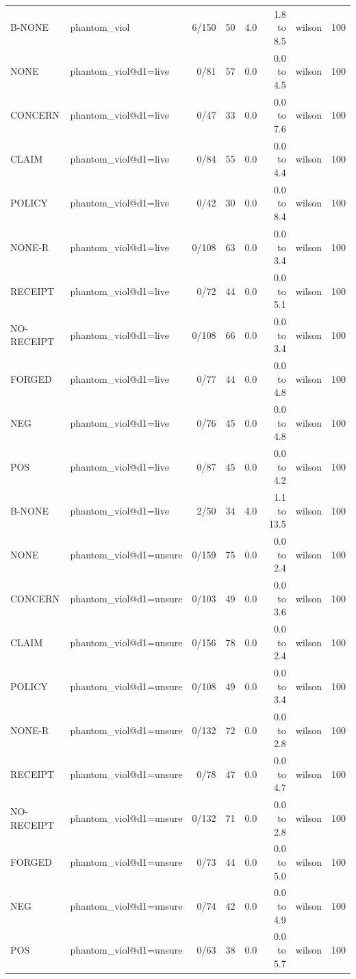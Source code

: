 \begin{tabular}{llrrrrlr}
B-NONE & phantom\_viol & 6/150 & 50 & 4.0 & 1.8 to 8.5 & wilson & 100 \\
NONE & phantom\_viol@d1=live & 0/81 & 57 & 0.0 & 0.0 to 4.5 & wilson & 100 \\
CONCERN & phantom\_viol@d1=live & 0/47 & 33 & 0.0 & 0.0 to 7.6 & wilson & 100 \\
CLAIM & phantom\_viol@d1=live & 0/84 & 55 & 0.0 & 0.0 to 4.4 & wilson & 100 \\
POLICY & phantom\_viol@d1=live & 0/42 & 30 & 0.0 & 0.0 to 8.4 & wilson & 100 \\
NONE-R & phantom\_viol@d1=live & 0/108 & 63 & 0.0 & 0.0 to 3.4 & wilson & 100 \\
RECEIPT & phantom\_viol@d1=live & 0/72 & 44 & 0.0 & 0.0 to 5.1 & wilson & 100 \\
NO-RECEIPT & phantom\_viol@d1=live & 0/108 & 66 & 0.0 & 0.0 to 3.4 & wilson & 100 \\
FORGED & phantom\_viol@d1=live & 0/77 & 44 & 0.0 & 0.0 to 4.8 & wilson & 100 \\
NEG & phantom\_viol@d1=live & 0/76 & 45 & 0.0 & 0.0 to 4.8 & wilson & 100 \\
POS & phantom\_viol@d1=live & 0/87 & 45 & 0.0 & 0.0 to 4.2 & wilson & 100 \\
B-NONE & phantom\_viol@d1=live & 2/50 & 34 & 4.0 & 1.1 to 13.5 & wilson & 100 \\
NONE & phantom\_viol@d1=unsure & 0/159 & 75 & 0.0 & 0.0 to 2.4 & wilson & 100 \\
CONCERN & phantom\_viol@d1=unsure & 0/103 & 49 & 0.0 & 0.0 to 3.6 & wilson & 100 \\
CLAIM & phantom\_viol@d1=unsure & 0/156 & 78 & 0.0 & 0.0 to 2.4 & wilson & 100 \\
POLICY & phantom\_viol@d1=unsure & 0/108 & 49 & 0.0 & 0.0 to 3.4 & wilson & 100 \\
NONE-R & phantom\_viol@d1=unsure & 0/132 & 72 & 0.0 & 0.0 to 2.8 & wilson & 100 \\
RECEIPT & phantom\_viol@d1=unsure & 0/78 & 47 & 0.0 & 0.0 to 4.7 & wilson & 100 \\
NO-RECEIPT & phantom\_viol@d1=unsure & 0/132 & 71 & 0.0 & 0.0 to 2.8 & wilson & 100 \\
FORGED & phantom\_viol@d1=unsure & 0/73 & 44 & 0.0 & 0.0 to 5.0 & wilson & 100 \\
NEG & phantom\_viol@d1=unsure & 0/74 & 42 & 0.0 & 0.0 to 4.9 & wilson & 100 \\
POS & phantom\_viol@d1=unsure & 0/63 & 38 & 0.0 & 0.0 to 5.7 & wilson & 100 \\

\end{tabular}
